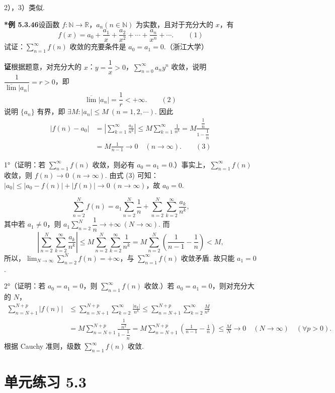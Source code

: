 \documentclass[UTF8, 12pt, fontset=fandol, oneside]{ctexart}
\begin{document}
2），3）类似.

\noindent\textbf{*例 5.3.46}\quad 设函数 $f:\mathbb N\to\mathbb R$，$a_n(n\in\mathbb N)$ 为实数，且对于充分大的 $x$，有
\[
  f(x)=a_0+\frac{a_1}{x}+\frac{a_2}{x^2}+\cdots+\frac{a_n}{x^n}+\cdots. \qquad(1)
\]
试证：$\displaystyle\sum_{n=1}^{\infty}f(n)$ 收敛的充要条件是 $a_0=a_1=0$.（浙江大学）

\noindent\textbf{证}\quad 根据题意，对充分大的 $x$：$y=\dfrac1x>0$，$\displaystyle\sum_{n=0}^{\infty}a_ny^n$ 收敛，说明 $\dfrac1{\overline{\lim}|a_n|}=r>0$，即
\[
  \overline{\lim}|a_n|=\frac1r<+\infty. \qquad(2)
\]
说明 $\{a_n\}$ 有界，即 $\exists M:|a_n|\le M\ (n=1,2,\cdots)$. 因此
\[
\begin{aligned}
|f(n)-a_0|
&=\left|\sum_{k=1}^{\infty}\frac{a_k}{n^k}\right|
\le M\sum_{k=1}^{\infty}\frac1{n^k}
=M\frac{\dfrac1n}{1-\dfrac1n}\\
&=M\frac1{n-1}\to0\quad(n\to\infty). \qquad(3)
\end{aligned}
\]

1°（证明：若 $\displaystyle\sum_{n=1}^{\infty}f(n)$ 收敛，则必有 $a_0=a_1=0$.）事实上，$\displaystyle\sum_{n=1}^{\infty}f(n)$ 收敛，则 $f(n)\to0\ (n\to\infty)$. 由式 (3) 可知：$|a_0|\le |a_0-f(n)|+|f(n)|\to0\ (n\to\infty)$，故 $a_0=0$.

\[
  \sum_{n=2}^N f(n)=a_1\sum_{n=2}^N\frac1n
  +\sum_{n=2}^N\sum_{k=2}^{\infty}\frac{a_k}{n^k},
\]
其中若 $a_1\ne0$，则 $a_1\displaystyle\sum_{n=2}^N\dfrac1n\to+\infty\ (N\to\infty)$. 而
\[
  \left|\sum_{n=2}^N\sum_{k=2}^{\infty}\frac{a_k}{n^k}\right|
  \le M\sum_{n=2}^N\sum_{k=2}^{\infty}\frac1{n^k}
  =M\sum_{n=2}^N\left(\frac1{n-1}-\frac1n\right)<M,
\]
所以，$\displaystyle\lim_{N\to\infty}\sum_{n=2}^N f(n)=+\infty$，与 $\displaystyle\sum_{n=1}^{\infty}f(n)$ 收敛矛盾. 故只能 $a_1=0$.

2°（证明：若 $a_0=a_1=0$，则 $\displaystyle\sum_{n=1}^{\infty}f(n)$ 收敛.）若 $a_0=a_1=0$，则对充分大的 $N$，
\[
\begin{aligned}
\sum_{n=N+1}^{N+p}|f(n)|
&\le\sum_{n=N+1}^{N+p}\sum_{k=2}^{\infty}\frac{|a_k|}{n^k}
\le\sum_{n=N+1}^{N+p}\sum_{k=2}^{\infty}\frac{M}{n^k}\\
&=M\sum_{n=N+1}^{N+p}\frac{\dfrac1{n^2}}{1-\dfrac1n}
=M\sum_{n=N+1}^{N+p}\left(\frac1{n-1}-\frac1n\right)
\le\frac MN\to0\quad(N\to\infty)\quad(\forall p>0).
\end{aligned}
\]
根据 Cauchy 准则，级数 $\displaystyle\sum_{n=1}^{\infty}f(n)$ 收敛.

\section*{单元练习 5.3}
\end{document}
